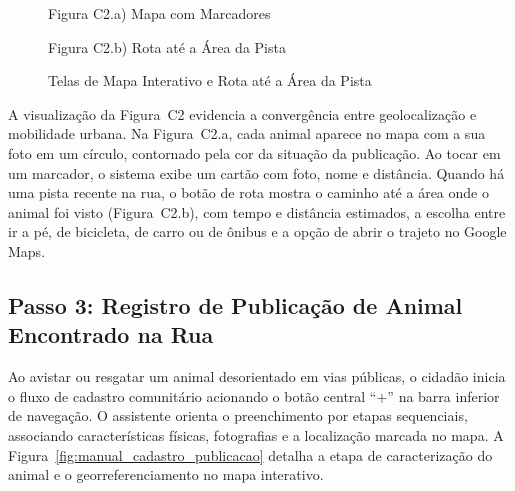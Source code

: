 \begin{figure}[H]
    \centering
    \caption{Telas de Mapa Interativo e Rota até a Área da Pista}
    \label{fig:manual_mapa_rotas}
    \vspace{0.15cm}
    \begin{minipage}[t]{0.48\textwidth}
        \centering
        \par\vspace{0.12cm}
        {\small Figura C2.a) Mapa com Marcadores}
    \end{minipage}
    \hfill
    \begin{minipage}[t]{0.48\textwidth}
        \centering
        \par\vspace{0.12cm}
        {\small Figura C2.b) Rota até a Área da Pista}
    \end{minipage}
    \par\vspace{0.1cm}
\end{figure}

A visualização da Figura~C2 evidencia a convergência entre geolocalização e mobilidade urbana. Na Figura~C2.a, cada animal aparece no mapa com a sua foto em um círculo, contornado pela cor da situação da publicação. Ao tocar em um marcador, o sistema exibe um cartão com foto, nome e distância. Quando há uma pista recente na rua, o botão de rota mostra o caminho até a área onde o animal foi visto (Figura~C2.b), com tempo e distância estimados, a escolha entre ir a pé, de bicicleta, de carro ou de ônibus e a opção de abrir o trajeto no Google Maps.

\clearpage

\subsection*{Passo 3: Registro de Publicação de Animal Encontrado na Rua}
\noindent
Ao avistar ou resgatar um animal desorientado em vias públicas, o cidadão inicia o fluxo de cadastro comunitário acionando o botão central ``+'' na barra inferior de navegação. O assistente orienta o preenchimento por etapas sequenciais, associando características físicas, fotografias e a localização marcada no mapa. A Figura~\ref{fig:manual_cadastro_publicacao} detalha a etapa de caracterização do animal e o georreferenciamento no mapa interativo.

